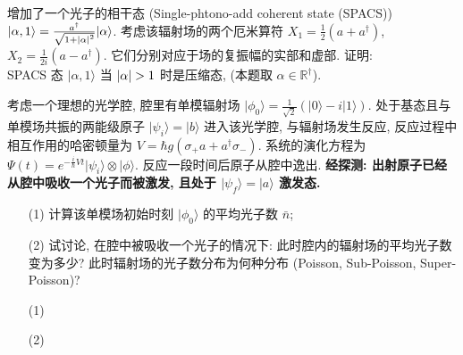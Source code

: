 \documentclass{assignment}
\begin{document}
\begin{prob}[20 分]
    增加了一个光子的相干态 (Single-phtono-add coherent state (SPACS)) $\lvert\alpha,1\rangle=\frac{a^{\dagger}}{\sqrt{1+\left\lvert\alpha\right\rvert^2}}\lvert\alpha\rangle$. 考虑该辐射场的两个厄米算符 $X_1=\frac{1}{2}(a+a^{\dagger})$, $X_2=\frac{1}{2i}(a-a^{\dagger})$. 它们分别对应于场的复振幅的实部和虚部. 证明:\\
    SPACS 态 $\lvert\alpha,1\rangle$ 当 $\left\lvert\alpha\right\rvert>1$ 时是压缩态, (本题取 $\alpha\in\mathbb{R}^{\dagger}$).
\end{prob}
\begin{pf}
    
\end{pf}

\begin{prob}[20 分]
    考虑一个理想的光学腔, 腔里有单模辐射场 $\lvert\phi_0\rangle=\frac{1}{\sqrt{2}}(\lvert 0\rangle-i\lvert 1\rangle)$. 处于基态且与单模场共振的两能级原子 $\lvert\psi_i\rangle=\lvert b\rangle$ 进入该光学腔, 与辐射场发生反应, 反应过程中相互作用的哈密顿量为 $V=\hbar g(\sigma_+a+a^{\dagger}\sigma_-)$. 系统的演化方程为 $\Psi(t)=e^{-\frac{i}{\hbar}Vt}\lvert\psi_i\rangle\otimes\lvert\phi\rangle$. 反应一段时间后原子从腔中逸出. \textbf{经探测: 出射原子已经从腔中吸收一个光子而被激发, 且处于 $\lvert\psi_f\rangle=\lvert a\rangle$ 激发态.}
    \begin{itemize}
        \item[(1)] 计算该单模场初始时刻 $\lvert\phi_0\rangle$ 的平均光子数 $\bar{n}$;
        \item[(2)] 试讨论, 在腔中被吸收一个光子的情况下: 此时腔内的辐射场的平均光子数变为多少? 此时辐射场的光子数分布为何种分布 (Poisson, Sub-Poisson, Super-Poisson)?
    \end{itemize}
\end{prob}
\begin{sol}
    \begin{itemize}
        \item[(1)] 
        \item[(2)] 
    \end{itemize}
\end{sol}
\end{document}
